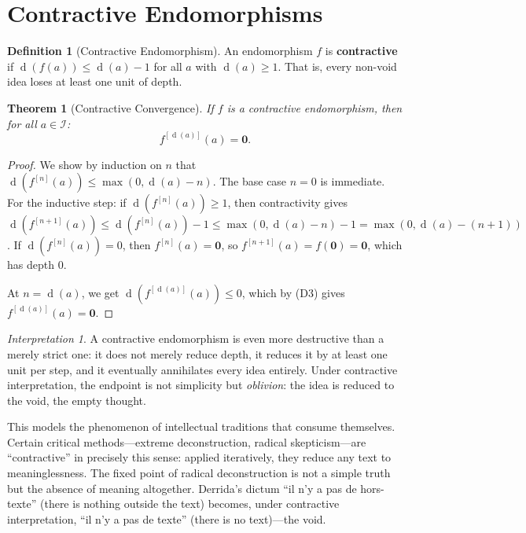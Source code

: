 \documentclass[11pt,openany]{book}
\theoremstyle{definition}
\newtheorem{definition}[axiom]{Definition}
\theoremstyle{plain}
\newtheorem{theorem}[axiom]{Theorem}
\theoremstyle{remark}
\newtheorem{interpretation}[axiom]{Interpretation}
\newcommand{\IS}{\mathcal{I}}               %
\newcommand{\void}{\mathbf{0}}              %
\newcommand{\depth}{\operatorname{d}}       %
\begin{document}
\section{Contractive Endomorphisms}

\begin{definition}[Contractive Endomorphism]
An endomorphism $f$ is \textbf{contractive} if $\depth(f(a)) \leq \depth(a) - 1$ for all $a$ with $\depth(a) \geq 1$. That is, every non-void idea loses at least one unit of depth.
\end{definition}

\begin{theorem}[Contractive Convergence]
If $f$ is a contractive endomorphism, then for all $a \in \IS$:
\[
f^{[\depth(a)]}(a) = \void.
\]
\end{theorem}

\begin{proof}
We show by induction on $n$ that $\depth(f^{[n]}(a)) \leq \max(0, \depth(a) - n)$. The base case $n = 0$ is immediate. For the inductive step: if $\depth(f^{[n]}(a)) \geq 1$, then contractivity gives $\depth(f^{[n+1]}(a)) \leq \depth(f^{[n]}(a)) - 1 \leq \max(0, \depth(a) - n) - 1 = \max(0, \depth(a) - (n+1))$. If $\depth(f^{[n]}(a)) = 0$, then $f^{[n]}(a) = \void$, so $f^{[n+1]}(a) = f(\void) = \void$, which has depth 0.

At $n = \depth(a)$, we get $\depth(f^{[\depth(a)]}(a)) \leq 0$, which by (D3) gives $f^{[\depth(a)]}(a) = \void$.
\end{proof}

\begin{interpretation}
A contractive endomorphism is even more destructive than a merely strict one: it does not merely reduce depth, it reduces it by at least one unit per step, and it eventually annihilates every idea entirely. Under contractive interpretation, the endpoint is not simplicity but \emph{oblivion}: the idea is reduced to the void, the empty thought.

This models the phenomenon of intellectual traditions that consume themselves. Certain critical methods---extreme deconstruction, radical skepticism---are ``contractive'' in precisely this sense: applied iteratively, they reduce any text to meaninglessness. The fixed point of radical deconstruction is not a simple truth but the absence of meaning altogether. Derrida's dictum ``il n'y a pas de hors-texte'' (there is nothing outside the text) becomes, under contractive interpretation, ``il n'y a pas de texte'' (there is no text)---the void.
\end{interpretation}
\end{document}
